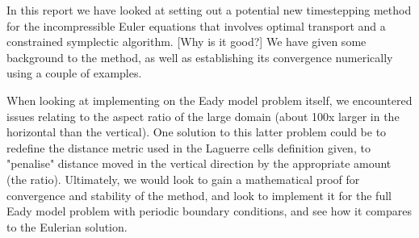\documentclass[11pt, oneside]{article}   	%
\begin{document}
In this report we have looked at setting out a potential new timestepping method for the incompressible Euler equations that involves optimal transport and a constrained symplectic algorithm. [Why is it good?] We have given some background to the method, as well as establishing its convergence numerically using a couple of examples. 

When looking at implementing on the Eady model problem itself, we encountered issues relating to the aspect ratio of the large domain (about 100x larger in the horizontal than the vertical). One solution to this latter problem could be to redefine the distance metric used in the Laguerre cells definition given, to "penalise" distance moved in the vertical direction by the appropriate amount (the ratio). Ultimately, we would look to gain a mathematical proof for convergence and stability of the method, and look to implement it for the full Eady model problem with periodic boundary conditions, and see how it compares to the Eulerian solution.



\end{document}
